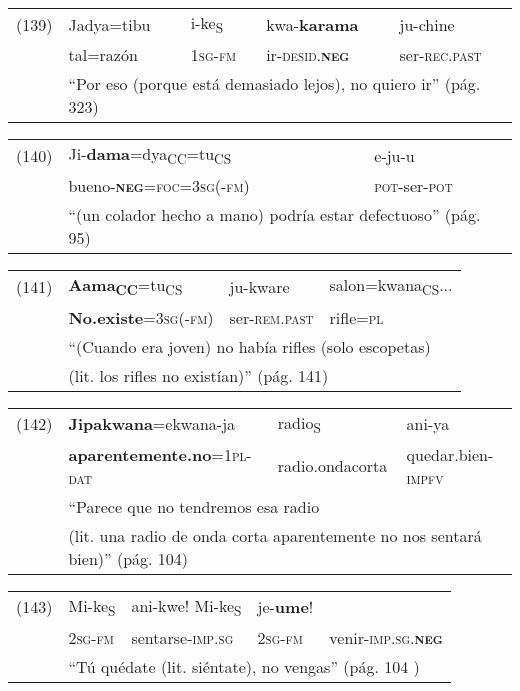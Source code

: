 {%
\begin{tabular}{lllll}
(139) & Jadya=tibu & i-ke\textsubscript{S} & kwa-\textbf{karama} & ju-chine \\
& tal=razón & \textsc{1sg-fm} & ir-\textsc{desid.\textbf{neg}} & ser-\textsc{rec.past}\\
& \multicolumn{4}{l}{``Por eso (porque está demasiado lejos), no quiero ir'' (pág. 323)}
\end{tabular} \vspace{0.5cm}

\begin{tabular}{lll}
(140) & Ji-\textbf{dama}=dya\textsubscript{CC}=tu\textsubscript{CS} & e-ju-u \\
& bueno-\textsc{\textbf{neg}=foc=3sg(-fm)} & \textsc{pot-}ser-\textsc{pot} \\
& \multicolumn{2}{l}{``(un colador hecho a mano) podría estar defectuoso'' (pág. 95)}
\end{tabular} \vspace{0.5cm}

\begin{tabular}{llll}
(141) & \textbf{Aama\textsubscript{CC}}=tu\textsubscript{CS} & ju-kware & salon=kwana\textsubscript{CS}... \\
& \textbf{No.existe}=\textsc{3sg(-fm)} & ser-\textsc{rem.past} & rifle=\textsc{pl} \\
& \multicolumn{3}{l}{``(Cuando era joven) no había rifles (solo escopetas)} \\
& \multicolumn{3}{l}{(lit. los rifles no existían)'' (pág. 141)}
\end{tabular} \vspace{0.5cm}

\begin{tabular}{llll}
(142) & \textbf{Jipakwana}=ekwana-ja & radio\textsubscript{S} & ani-ya \\
& \textbf{aparentemente.no}=\textsc{1pl-dat} & radio.ondacorta & quedar.bien-\textsc{impfv}\\
& \multicolumn{3}{l}{``Parece que no tendremos esa radio} \\
& \multicolumn{3}{l}{(lit. una radio de onda corta aparentemente no nos sentará bien)'' (pág. 104)}
\end{tabular} \vspace{0.5cm}

\begin{tabular}{lllll}
(143) & Mi-ke\textsubscript{S} & ani-kwe! Mi-ke\textsubscript{S} & je-\textbf{ume}! \\
& \textsc{2sg-fm} & sentarse-\textsc{imp.sg} & \textsc{2sg-fm} & venir-\textsc{imp.sg.\textbf{neg}} \\
& \multicolumn{4}{l}{``Tú quédate (lit. siéntate), no vengas'' (pág. 104 )}
\end{tabular} \vspace{0.5cm}

}

